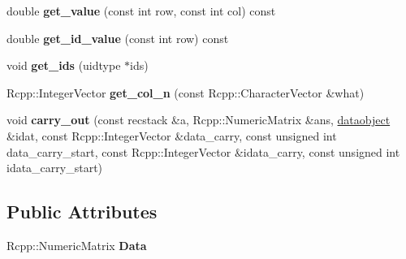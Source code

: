 \begin{DoxyCompactItemize}
\mbox{\label{classdataobject_a72cc6a0334d9eed18931deb66e283bca}} 
double {\bfseries get\+\_\+value} (const int row, const int col) const
\item 
\mbox{\label{classdataobject_acb2e5de26d52f9518fe6cc040dad21a1}} 
double {\bfseries get\+\_\+id\+\_\+value} (const int row) const
\item 
\mbox{\label{classdataobject_a08757c6b3b80dc258f8271dd5c24b737}} 
void {\bfseries get\+\_\+ids} (uidtype $\ast$ids)
\item 
\mbox{\label{classdataobject_a61b4b28130bb76d1d745e055855c70ea}} 
Rcpp\+::\+Integer\+Vector {\bfseries get\+\_\+col\+\_\+n} (const Rcpp\+::\+Character\+Vector \&what)
\item 
\mbox{\label{classdataobject_a55d175292d064600c8c95550328b3a66}} 
void {\bfseries carry\+\_\+out} (const recstack \&a, Rcpp\+::\+Numeric\+Matrix \&ans, \hyperlink{classdataobject}{dataobject} \&idat, const Rcpp\+::\+Integer\+Vector \&data\+\_\+carry, const unsigned int data\+\_\+carry\+\_\+start, const Rcpp\+::\+Integer\+Vector \&idata\+\_\+carry, const unsigned int idata\+\_\+carry\+\_\+start)
\end{DoxyCompactItemize}
\subsection*{Public Attributes}
\begin{DoxyCompactItemize}
\item 
\mbox{\label{classdataobject_ae06ddbecdefdbabd9d91c6904ac7997a}} 
Rcpp\+::\+Numeric\+Matrix {\bfseries Data}
\end{DoxyCompactItemize}
